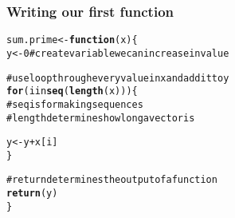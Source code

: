 \documentclass{beamer}\usepackage{graphicx, color}
\makeatletter
\newcommand{\hlfunctioncall}[1]{\textcolor[rgb]{0.501960784313725,0,0.329411764705882}{\textbf{#1}}}%
\newcommand{\hlcomment}[1]{\textcolor[rgb]{0.180392156862745,0.6,0.341176470588235}{#1}}%
\newenvironment{kframe}{%
 \def\at@end@of@kframe{}%
 \ifinner\ifhmode%
  \def\at@end@of@kframe{\end{minipage}}%
  \begin{minipage}{\columnwidth}%
 \fi\fi%
 \def\FrameCommand##1{\hskip\@totalleftmargin \hskip-\fboxsep
 \colorbox{shadecolor}{##1}\hskip-\fboxsep
     \hskip-\linewidth \hskip-\@totalleftmargin \hskip\columnwidth}%
 \MakeFramed {\advance\hsize-\width
   \@totalleftmargin\z@ \linewidth\hsize
   \@setminipage}}%
 {\par\unskip\endMakeFramed%
 \at@end@of@kframe}
\newenvironment{knitrout}{}{} %
\makeatother
\begin{document}
\begin{frame}[fragile]
  \frametitle{Writing our first function}

\begin{knitrout}\small
{}\color{fgcolor}\begin{kframe}
\begin{alltt}
sum.prime <- \hlfunctioncall{function}(x) \{
  y <- 0  \hlcomment{# create variable we can increase in value}

\hlcomment{  # use loop through every value in x and add it to y}
  \hlfunctioncall{for}(i in \hlfunctioncall{seq}(\hlfunctioncall{length}(x))) \{  
\hlcomment{    # seq is for making sequences }
\hlcomment{    # length determines how long a vector is}
    
    y <- y + x[i]
  \}

\hlcomment{  # return determines the output of a function}
  \hlfunctioncall{return}(y)
\}
\end{alltt}
\end{kframe}
\end{knitrout}


\end{frame}
\end{document}

